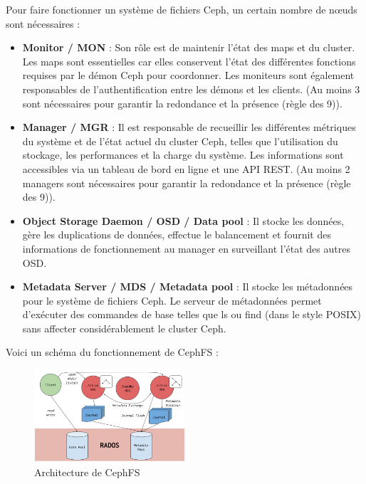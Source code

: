 \documentclass[a4paper,french,12pt, titlepage]{article}
\begin{document}
Pour faire fonctionner un système de fichiers Ceph, un certain nombre de
nœuds sont nécessaires :\newline

\begin{itemize}
\item
  \textbf{Monitor / MON} : Son rôle est de maintenir l'état des maps et
  du cluster. Les maps sont essentielles car elles conservent l'état des
  différentes fonctions requises par le démon Ceph pour coordonner. Les
  moniteurs sont également responsables de l'authentification entre les
  démons et les clients. (Au moins 3 sont nécessaires pour garantir la
  redondance et la présence (règle des 9)).
\item
  \textbf{Manager / MGR} : Il est responsable de recueillir les
  différentes métriques du système et de l'état actuel du cluster Ceph,
  telles que l'utilisation du stockage, les performances et la charge du
  système. Les informations sont accessibles via un tableau de bord en
  ligne et une API REST. (Au moins 2 managers sont nécessaires pour
  garantir la redondance et la présence (règle des 9)).
\item
  \textbf{Object Storage Daemon / OSD / Data pool} : Il stocke les
  données, gère les duplications de données, effectue le balancement et
  fournit des informations de fonctionnement au manager en surveillant
  l'état des autres OSD.
\item
  \textbf{Metadata Server / MDS / Metadata pool} : Il stocke les
  métadonnées pour le système de fichiers Ceph. Le serveur de
  métadonnées permet d'exécuter des commandes de base telles que ls ou
  find (dans le style POSIX) sans affecter considérablement le cluster
  Ceph.\newline
\end{itemize}

Voici un schéma du fonctionnement de CephFS :

\begin{figure}[h]
\centering
\includegraphics[width=0.5\textwidth,height=0.5\textheight,keepaspectratio]{images/shema-cephfs.png}
\caption{Architecture de CephFS}
\end{figure}
\end{document}
